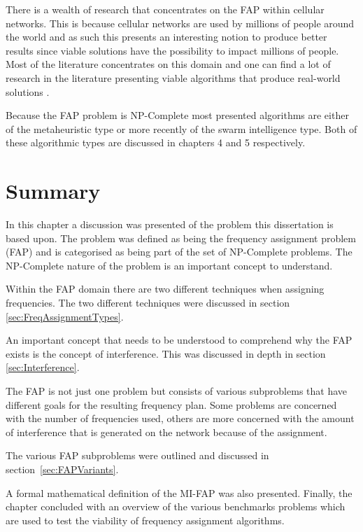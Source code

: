 There is a wealth of research that concentrates on the FAP within cellular networks. This is because cellular networks are used by millions of people around the world and as such this presents an interesting notion to produce better results since viable solutions have the possibility to impact millions of people. Most of the literature concentrates on this domain and one can find a lot of research in the literature presenting viable algorithms that produce real-world solutions \cite{Eisenblatter}. 

Because the FAP problem is NP-Complete most presented algorithms are either of the metaheuristic type or more recently of the swarm intelligence type. Both of these algorithmic types are discussed in chapters 4 and 5 respectively.
\section{Summary}
In this chapter a discussion was presented of the problem this dissertation is based upon. The problem was defined as being the frequency assignment problem (FAP) and is categorised as being part of the set of NP-Complete problems. The NP-Complete nature of the problem is an important concept to understand.

Within the FAP domain there are two different techniques when assigning frequencies. The two different techniques were discussed in section \ref{sec:FreqAssignmentTypes}. 

An important concept that needs to be understood to comprehend why the FAP exists is the concept of interference. This was discussed in depth in section \ref{sec:Interference}.

The FAP is not just one problem but consists of various subproblems that have different goals for the resulting frequency plan. Some problems are concerned with the number of frequencies used, others are more concerned with the amount of interference that is generated on the network because of the assignment.

The various FAP subproblems were outlined and discussed in section~\ref{sec:FAPVariants}.

A formal mathematical definition of the MI-FAP was also presented. Finally, the chapter concluded with an overview of the various benchmarks problems which are used to test the viability of frequency assignment algorithms.
